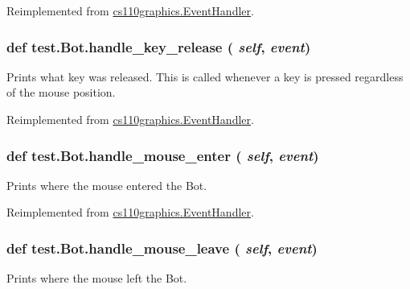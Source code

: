 Reimplemented from \hyperlink{classcs110graphics_1_1EventHandler_af3fb3531d0b23f1430a830586cd07906}{cs110graphics.EventHandler}.\hypertarget{classtest_1_1Bot_a173d0fff530e0987193e9006b24f218b}{
\subsubsection[{handle\_\-key\_\-release}]{\setlength{\rightskip}{0pt plus 5cm}def test.Bot.handle\_\-key\_\-release ( {\em self}, \/   {\em event})}}
\label{classtest_1_1Bot_a173d0fff530e0987193e9006b24f218b}
\begin{DoxyVerb}Prints what key was released. This is called whenever a key is
pressed regardless of the mouse position. \end{DoxyVerb}
 

Reimplemented from \hyperlink{classcs110graphics_1_1EventHandler_a2849f60251baa44252992162521f2473}{cs110graphics.EventHandler}.\hypertarget{classtest_1_1Bot_a0b184ab86d0dd6121e55394a24c8751e}{
\subsubsection[{handle\_\-mouse\_\-enter}]{\setlength{\rightskip}{0pt plus 5cm}def test.Bot.handle\_\-mouse\_\-enter ( {\em self}, \/   {\em event})}}
\label{classtest_1_1Bot_a0b184ab86d0dd6121e55394a24c8751e}
\begin{DoxyVerb}Prints where the mouse entered the Bot. \end{DoxyVerb}
 

Reimplemented from \hyperlink{classcs110graphics_1_1EventHandler_a13af3268f8a1aa36b8483eb2deffef15}{cs110graphics.EventHandler}.\hypertarget{classtest_1_1Bot_a2b65e6ecaba1afb4f117b74a684b4387}{
\subsubsection[{handle\_\-mouse\_\-leave}]{\setlength{\rightskip}{0pt plus 5cm}def test.Bot.handle\_\-mouse\_\-leave ( {\em self}, \/   {\em event})}}
\label{classtest_1_1Bot_a2b65e6ecaba1afb4f117b74a684b4387}
\begin{DoxyVerb}Prints where the mouse left the Bot. \end{DoxyVerb}
 

